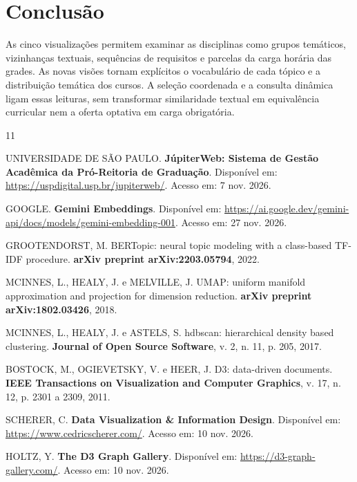 \documentclass[
  12pt,
  oneside,
  a4paper,
  article,
  brazil
]{USPSC-classe/USPSC}
\begin{document}
\section{Conclusão}

As cinco visualizações permitem examinar as disciplinas como grupos temáticos,
vizinhanças textuais, sequências de requisitos e parcelas da carga horária das
grades. As novas visões tornam explícitos o vocabulário de cada tópico e a
distribuição temática dos cursos. A seleção coordenada e a consulta dinâmica
ligam essas leituras, sem transformar similaridade textual em equivalência
curricular nem a oferta optativa em carga obrigatória.

\newpage

\begin{thebibliography}{11}

UNIVERSIDADE DE SÃO PAULO. \textbf{JúpiterWeb: Sistema de Gestão Acadêmica da
Pró-Reitoria de Graduação}. Disponível em:
\url{https://uspdigital.usp.br/jupiterweb/}. Acesso em: 7 nov. 2026.

GOOGLE. \textbf{Gemini Embeddings}. Disponível em:
\url{https://ai.google.dev/gemini-api/docs/models/gemini-embedding-001}. Acesso em: 27 nov. 2026.

GROOTENDORST, M. BERTopic: neural topic modeling with a class-based TF-IDF
procedure. \textbf{arXiv preprint arXiv:2203.05794}, 2022.

MCINNES, L., HEALY, J. e MELVILLE, J. UMAP: uniform manifold approximation and
projection for dimension reduction. \textbf{arXiv preprint arXiv:1802.03426},
2018.

MCINNES, L., HEALY, J. e ASTELS, S. hdbscan: hierarchical density based
clustering. \textbf{Journal of Open Source Software}, v. 2, n. 11, p. 205, 2017.

BOSTOCK, M., OGIEVETSKY, V. e HEER, J. D3: data-driven documents.
\textbf{IEEE Transactions on Visualization and Computer Graphics}, v. 17,
n. 12, p. 2301 a 2309, 2011.

SCHERER, C. \textbf{Data Visualization \& Information Design}. Disponível em:
\url{https://www.cedricscherer.com/}. Acesso em: 10 nov. 2026.

HOLTZ, Y. \textbf{The D3 Graph Gallery}. Disponível em:
\url{https://d3-graph-gallery.com/}. Acesso em: 10 nov. 2026.

\end{thebibliography}
\end{document}
